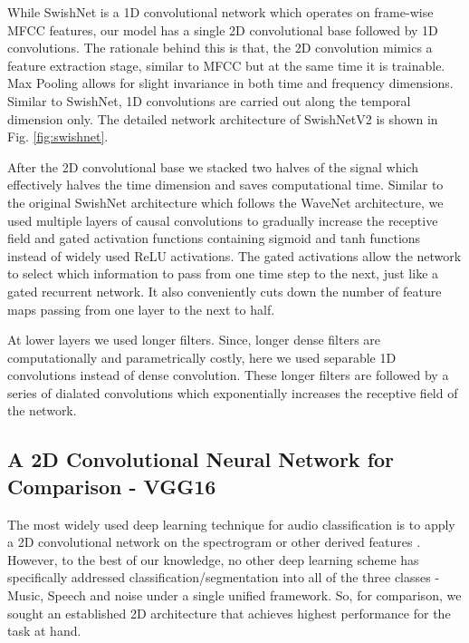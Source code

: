 \documentclass{article}
\begin{document}
While SwishNet is a 1D convolutional network which operates on frame-wise MFCC features, our model has a single 2D convolutional base followed by 1D convolutions. The rationale behind this is that, the 2D convolution mimics a feature extraction stage, similar to MFCC but at the same time it is trainable. Max Pooling allows for slight invariance in both time and frequency dimensions. Similar to SwishNet, 1D convolutions are carried out along the temporal dimension only. The detailed network architecture of SwishNetV2 is shown in Fig. \ref{fig:swishnet}.
	
	
After the 2D convolutional base we stacked two halves of the signal which effectively halves the time dimension and saves computational time. Similar to the original SwishNet architecture which follows the WaveNet \cite{VanDenOord2016b} architecture, we used multiple layers of causal convolutions to gradually increase the receptive field and gated activation functions \cite{VandenOord2016a} containing sigmoid and tanh functions instead of widely used ReLU activations. The gated activations allow the network to select which information to pass from one time step to the next, just like a gated recurrent network. It also conveniently cuts down the number of feature maps passing from one layer to the next to half.
	
	
At lower layers we used longer filters. Since, longer dense filters are computationally and parametrically costly, here we used separable 1D convolutions \cite{Chollet2016} instead of dense convolution. These longer filters are followed by a series of dialated convolutions which exponentially increases the receptive field of the network.
	
\subsection{A 2D Convolutional Neural Network for Comparison - VGG16}
The most widely used deep learning technique for audio classification is to apply a 2D convolutional network on the spectrogram or other derived features \cite{Sercu2016,Hershey2017,Takahashi2016}. However, to the best of our knowledge, no other deep learning scheme has specifically addressed classification/segmentation into all of the three classes - Music, Speech and noise under a single unified framework. So, for comparison, we sought an established 2D architecture that achieves highest performance for the task at hand.
	
\end{document}
